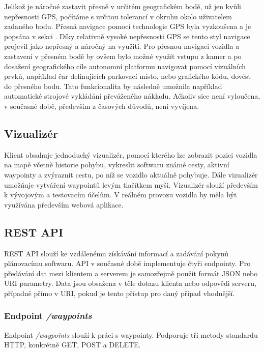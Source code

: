 \documentclass[czech,bachelor,dept460,male,cpp,cpdeclaration]{diploma}
\begin{document}
Jelikož je náročné zastavit přesně v určitém geografickém bodě, už jen kvůli nepřesnosti GPS, počítáme s určitou tolerancí
v okruhu okolo uživatelem zadaného bodu. Přesná navigace pomocí technologie GPS byla vyzkoušena a je popsána v sekci
. Díky relativně vysoké nepřesnosti GPS se tento styl navigace projevil jako nepřesný a náročný na využití.
Pro přesnou navigaci vozidla a zastavení v přesném bodě by ovšem bylo možné využít vstupu z kamer a po dosažení geografického cíle
autonomní platformu navigovat pomocí vizuálních prvků, například čar definujících parkovací místo, nebo grafického kódu, dovést
do přesného bodu. Tato funkcionalita by následně umožnila například automatické strojové vykládání převáženého nákladu. Ačkoliv 
sice není vyloučena, v současné době, především z časových důvodů, není vyvíjena.

\subsection{Vizualizér} \label{visualizer}

Klient obsahuje jednoduchý vizualizér, pomocí kterého lze zobrazit pozici vozidla na mapě včetně historie pohybu, vykreslit 
softwaru známé cesty, aktivní waypointy a zvýraznit cestu, po níž se vozidlo aktuálně pohybuje. Dále vizualizér umožňuje vytváření 
waypointů levým tlačítkem myši. Vizualizér slouží především k vývojovým a testovacím účelům. V reálném provozu vozidla by měla
být využívána především webová aplikace. 

\subsection{REST API} \label{rest-api}

REST API slouží ke vzdálenému získávání informací a zadávání pokynů plánovacímu softwaru. API v současné době implementuje čtyři 
endpointy. Pro předávání dat mezi klientem a serverem je samozřejmě použit formát JSON nebo URI parametry. Data jsou obsažena 
v těle dotazu klienta nebo odpovědi serveru, případně přímo v URI, pokud je tento přístup pro daný případ vhodnější.

\subsubsection{Endpoint \emph{/waypoints}}

Endpoint \emph{/waypoints} slouží k práci s waypointy. Podporuje tři metody standardu HTTP, konkrétně GET, POST a DELETE. 
\end{document}
